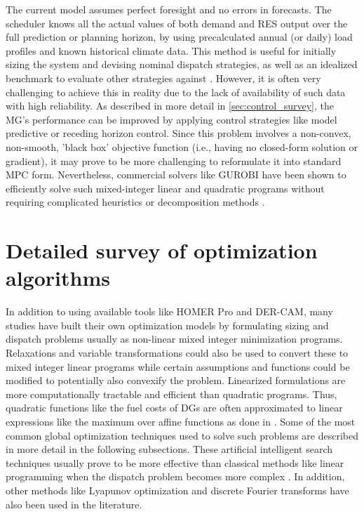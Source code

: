 \documentclass[final,3p,times]{elsarticle}
\begin{document}
The current model assumes perfect foresight and no errors in forecasts. The scheduler knows all the actual values of both demand and RES output over the full prediction or planning horizon, by using precalculated annual (or daily) load profiles and known historical climate data. This method is useful for initially sizing the system and devising nominal dispatch strategies, as well as an idealized benchmark to evaluate other strategies against \cite{parisio2014}. However, it is often very challenging to achieve this in reality due to the lack of availability of such data with high reliability. As described in more detail in \cref{sec:control_survey}, the MG's performance can be improved by applying control strategies like model predictive or receding horizon control. Since this problem involves a non-convex, non-smooth, 'black box' objective function (i.e., having no closed-form solution or gradient), it may prove to be more challenging to reformulate it into standard MPC form. Nevertheless, commercial solvers like GUROBI have been shown to efficiently solve such mixed-integer linear and quadratic programs without requiring complicated heuristics or decomposition methods \cite{parisio2014}. 

\section{Detailed survey of optimization algorithms \label{app:opt_alg}}

In addition to using available tools like HOMER Pro and DER-CAM, many studies have built their own optimization models by formulating sizing and dispatch problems usually as non-linear mixed integer minimization programs. Relaxations and variable transformations could also be used to convert these to mixed integer linear programs while certain assumptions and functions could be modified to potentially also convexify the problem. Linearized formulations are more computationally tractable and efficient than quadratic programs. Thus, quadratic functions like the fuel costs of DGs are often approximated to linear expressions like the maximum over affine functions as done in \cite{parisio2014}. Some of the most common global optimization techniques used to solve such problems are described in more detail in the following subsections. These artificial intelligent search techniques usually prove to be more effective than classical methods like linear programming when the dispatch problem becomes more complex \cite{Qu2018}. In addition, other methods like Lyapunov optimization \cite{pathak2017} and discrete Fourier transforms \cite{dft} have also been used in the literature.
\end{document}
